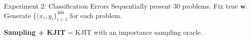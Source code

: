 \documentclass[english]{beamer}
\begin{document}
\begin{frame}
\begin{columns}[t]
\begin{block}{ Experiment 2: Classification Errors}
    Sequentially present 30 problems. Fix true
        $\boldsymbol{w}$. Generate $\{(x_i, y_i\}_{i=1}^{300}$ for each problem.
\begin{figure}[ht]
    \vspace{5mm}
  \centering
  \hspace{5mm}
  \label{fig:logistic_performance}
\end{figure}

\textbf{Sampling + KJIT} = KJIT with an importance sampling oracle.

\end{block}



\end{columns}
\end{frame}
\end{document}
